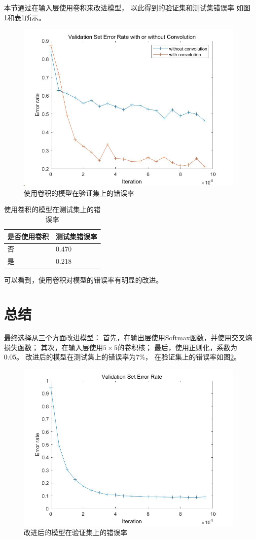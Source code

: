 \documentclass{article}
\begin{document}
本节通过在输入层使用卷积来改进模型，
以此得到的验证集和测试集错误率
如图\ref{fig:10}和表\ref{table:10}所示。

\begin{figure}[h]
\includegraphics[width=\textwidth]{10.jpg}
\caption{使用卷积的模型在验证集上的错误率}
\label{fig:10}
\end{figure}

\begin{table}[h]
\centering
\begin{tabular}{|l|l|} 
\hline
是否使用卷积 & 测试集错误率 \\
\hline
否 & 0.470 \\
是 & 0.218 \\
\hline
\end{tabular}
\caption{使用卷积的模型在测试集上的错误率}
\label{table:10}
\end{table}

可以看到，使用卷积对模型的错误率有明显的改进。

\section{总结}

最终选择从三个方面改进模型：
首先，在输出层使用Softmax函数，并使用交叉熵损失函数；
其次，在输入层使用$ 5 \times 5 $的卷积核；
最后，使用正则化，系数为0.05。
改进后的模型在测试集上的错误率为7\%，
在验证集上的错误率如图\ref{fig:11}。

\begin{figure}[h]
\includegraphics[width=\textwidth]{11.jpg}
\caption{改进后的模型在验证集上的错误率}
\label{fig:11}
\end{figure}
\end{document}
